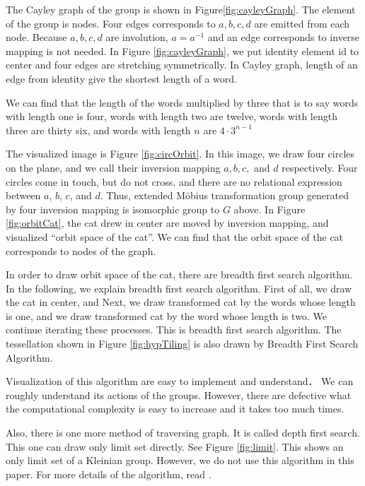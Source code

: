 The Cayley graph of the group is shown in Figure\ref{fig:cayleyGraph}.
The element of the group is nodes. Four edges corresponds to 
$a, b, c, d$ are emitted from each node.
Because $a, b, c, d$ are involution, $a=a^{-1}$ and
an edge corresponds to inverse mapping is not needed.
In Figure \ref{fig:cayleyGraph}, we put identity element $\mathrm{id}$
to center and four edges are stretching symmetrically.
In Cayley graph, length of an edge from identity give the shortest
length of a word.

We can find that the length of the words multiplied by three
that is to say words with length one is four, words with length two are
twelve, words with length three are thirty six, and words with length
$n$ are $4 \cdot 3^{n-1}$

The visualized image is Figure \ref{fig:circOrbit}. In this image,
we draw four circles on the plane, and we call their inversion mapping
$a, b, c,$ and $ d$ respectively. Four circles come in touch, but do not cross,
and there are no relational expression between $a$, $b$, $c$, and $d$.
Thus, extended M\"obius transformation group generated by four inversion
mapping is isomorphic group to $G$ above.
In Figure \ref{fig:orbitCat}, the cat drew in center are moved by
inversion mapping, and visualized ``orbit space of the cat''.
We can find that the orbit space of the cat corresponds to nodes of
the graph.

In order to draw orbit space of the cat, there are breadth first search
algorithm.
In the following, we explain breadth first search algorithm.
First of all, we draw the cat in center, and
Next, we draw transformed cat by the words whose length is one,
and we draw transformed cat by the word whose length is two.
We continue iterating these processes.
This is breadth first search algorithm.
The tessellation shown in Figure \ref{fig:hypTiling} is also drawn by
Breadth First Search Algorithm.

Visualization of this algorithm are easy to implement and understand．
We can roughly understand its actions of the groups.
However, there are defective what the computational complexity is 
easy to increase and it takes too much times.

Also, there is one more method of traversing graph.
It is called depth first search.
This one can draw only limit set directly.
See Figure \ref{fig:limit}. This shows an only limit set of a Kleinian
group.
However, we do not use this algorithm in this paper.
For more details of the algorithm, read \cite{MumfordSeriesWright200204}.

